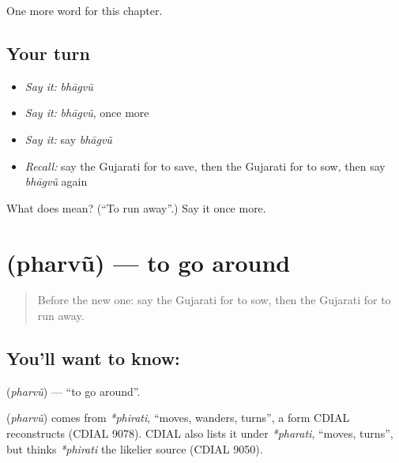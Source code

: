 \begin{grammarlens}[title={What you've built}]
One more word for this chapter.
\end{grammarlens}

\subsection*{Your turn}
\begin{itemize}
\raggedright
  \item \emph{Say it:} \emph{bhāgvũ}
  \item \emph{Say it:} \emph{bhāgvũ}, once more
  \item \emph{Say it:} say \emph{bhāgvũ}
  \item \emph{Recall:} say the Gujarati for to save, then the Gujarati for to sow, then say \emph{bhāgvũ} again
\end{itemize}

\begin{tcolorbox}[breakable,colback=teal!4,colframe=teal!35!black,title={Before you move on}]
What does  mean? (\textquotedblleft{}To run away\textquotedblright{}.) Say it once more.
\end{tcolorbox}
\section[\texorpdfstring{\gu{ફરવું} (pharvũ)}{ફરવું (pharvũ)}]{ (pharvũ) — to go around}

\label{lesson:GU-C143-pharvu}



\begin{quote}
Before the new one: say the Gujarati for to sow, then the Gujarati for to run away.
\end{quote}

\subsection*{You'll want to know: }
\textbf{} (\emph{pharvũ}) — \textquotedblleft{}to go around\textquotedblright{}.

\begin{cousinweb}
\textbf{} (\emph{pharvũ}) comes from \emph{*phirati}, \textquotedblleft{}moves, wanders, turns\textquotedblright{}, a form CDIAL reconstructs (CDIAL 9078). CDIAL also lists it under \emph{*pharati}, \textquotedblleft{}moves, turns\textquotedblright{}, but thinks \emph{*phirati} the likelier source (CDIAL 9050).
\end{cousinweb}

